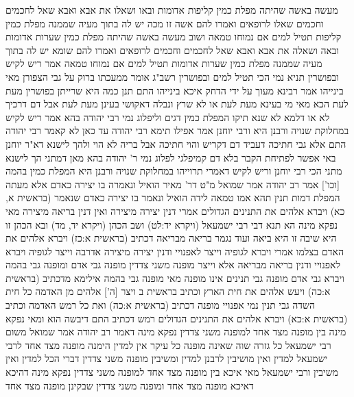 \documentclass[12pt, openany]{book}
\begin{document}
{מעשה באשה שהיתה מפלת כמין קליפות אדומות ובאו ושאלו את אבא ואבא שאל לחכמים וחכמים שאלו לרופאים ואמרו להם  אשה זו מכה יש לה בתוך מעיה שממנה מפלת כמין קליפות תטיל למים אם נמוחו טמאה 
ושוב מעשה באשה שהיתה מפלת כמין שערות אדומות ובאה ושאלה את אבא ואבא שאל לחכמים וחכמים לרופאים ואמרו להם  שומא יש לה בתוך מעיה שממנה מפלת כמין שערות אדומות תטיל למים אם נמוחו טמאה 
אמר ריש לקיש  ובפושרין  תניא נמי הכי  תטיל למים ובפושרין  רשב"ג אומר  ממעכתו ברוק על גבי הצפורן  מאי בינייהו  אמר רבינא  מעוך על ידי הדחק איכא בינייהו 
התם תנן  כמה היא שרייתן בפושרין מעת לעת הכא מאי  מי בעינא מעת לעת או לא 
שרץ ונבלה דאקושי בעינן מעת לעת אבל דם דרכיך לא או דלמא לא שנא  תיקו
המפלת כמין דגים וליפלוג נמי רבי יהודה בהא 
אמר ריש לקיש  במחלוקת שנויה ורבנן היא  ורבי יוחנן אמר  אפילו תימא רבי יהודה  עד כאן לא קאמר רבי יהודה התם אלא גבי חתיכה דעביד דם דקריש והוי חתיכה אבל בריה לא הוי 
ולהך לישנא דא"ר יוחנן  באי אפשר לפתיחת הקבר בלא דם קמיפלגי לפלוג נמי ר' יהודה בהא 
מאן דמתני הך לישנא מתני הכי  רבי יוחנן וריש לקיש דאמרי תרוייהו במחלוקת שנויה ורבנן היא
המפלת כמין בהמה [וכו']
אמר רב יהודה אמר שמואל  מ"ט דר' מאיר הואיל ונאמרה בו יצירה כאדם 
אלא מעתה המפלת דמות תנין תהא אמו טמאה לידה הואיל ונאמר בו יצירה כאדם שנאמר (בראשית א, כא) ויברא אלהים את התנינים הגדולים 
אמרי  דנין יצירה מיצירה ואין דנין בריאה מיצירה 
מאי נפקא מינה  הא תנא דבי רבי ישמעאל  (ויקרא יד:לט) ושב הכהן (ויקרא יד, מד) ובא הכהן זו היא שיבה זו היא ביאה 
ועוד  נגמר בריאה מבריאה דכתיב (בראשית א:כז) ויברא אלהים את האדם בצלמו 
אמרי  ויברא לגופיה וייצר לאפנויי ודנין יצירה מיצירה 
אדרבה  וייצר לגופיה ויברא לאפנויי ודנין בריאה מבריאה 
אלא  וייצר מופנה משני צדדין מופנה גבי אדם ומופנה גבי בהמה  ויברא גבי אדם מופנה גבי תנינים אינו מופנה 
מאי מופנה גבי בהמה  אילימא מדכתיב (בראשית א:כה) ויעש אלהים את חית הארץ וכתיב {בראשית ב } ויצר [ה'] אלהים מן האדמה כל חית השדה גבי תנין נמי אפנויי מופנה דכתיב (בראשית א:כה) ואת כל רמש האדמה וכתיב (בראשית א:כא) ויברא אלהים את התנינים הגדולים 
רמש דכתיב התם דיבשה הוא  ומאי נפקא מינה בין מופנה מצד אחד למופנה משני צדדין 
נפקא מינה דאמר רב יהודה אמר שמואל משום רבי ישמעאל  כל גזרה שוה שאינה מופנה כל עיקר אין למדין הימנה  מופנה מצד אחד לרבי ישמעאל למדין ואין מושיבין לרבנן למדין ומשיבין  מופנה משני צדדין דברי הכל למדין ואין משיבין 
ורבי ישמעאל מאי איכא בין מופנה מצד אחד למופנה משני צדדין  נפקא מינה דהיכא דאיכא מופנה מצד אחד ומופנה משני צדדין שבקינן מופנה מצד אחד}
\end{document}
